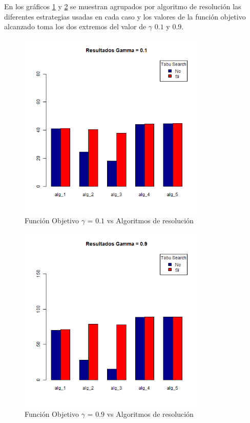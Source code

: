 En los gráficos \ref{res:img-papers-agr-gamma01} y \ref{res:img-papers-agr-gamma09} se muestran agrupados por algoritmo de resolución las diferentes estrategias usadas en cada caso y los valores de la función objetivo alcanzado toma los dos extremos del valor de $\gamma$ $0.1$ y $0.9$. 

\begin{figure}[H]
  \centering
    \includegraphics[width=0.8\textwidth]{resultados/papers/Graficos_agrupados/gamma01.png}
  \caption{Función Objetivo $\gamma$ = $0.1$ vs Algoritmos de resolución}
  \label{res:img-papers-agr-gamma01}
\end{figure}

\begin{figure}[H]
  \centering
    \includegraphics[width=0.8\textwidth]{resultados/papers/Graficos_agrupados/gamma09.png}
  \caption{Función Objetivo $\gamma$ = $0.9$ vs Algoritmos de resolución}
  \label{res:img-papers-agr-gamma09}
\end{figure}

